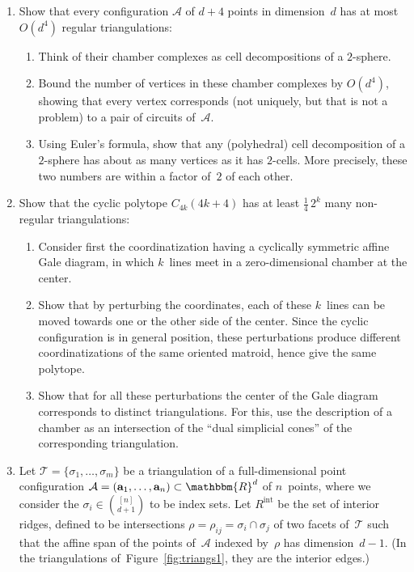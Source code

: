 \documentclass[11pt]{amsart}
\newcommand{\cA}{\mathcal{A}}
\newcommand{\cT}{\mathcal{T}}
\newcommand{\RR}{\mathbbm{R}}
\newcommand{\aaa}{\mathbf{a}}
\newcommand{\defn}[1]{{\color{blue}#1}}
\begin{document}
\begin{enumerate}
  \bigskip

\item
  Show that every configuration $\cA$ of $d+4$ points in dimension~$d$
  has at most $O(d^4)$ regular triangulations:
  \begin{enumerate}
  \item
    Think of their chamber complexes as cell decompositions of a $2$-sphere.

  \item
    Bound the number of vertices in these chamber complexes by $O(d^4)$,
    showing that every vertex corresponds
    (not uniquely, but that is not a problem)
    to a pair of circuits of~$\cA$.

  \item
    Using Euler's formula, show that any (polyhedral) cell
    decomposition of a $2$-sphere has about as many vertices as it has
    $2$-cells. More precisely, these two numbers are within a factor of~$2$
     of each other.
   \end{enumerate}

   \bigskip

 \item
   Show that the cyclic polytope $C_{4k}(4k+4)$ has at least $\frac14\,2^k$ many
   non-regular triangulations:
   \begin{enumerate}
   \item
     Consider first the coordinatization having a cyclically symmetric affine
     Gale diagram, in which $k$~lines meet in a zero-dimensional chamber
     at the center.

   \item
     Show that by perturbing the coordinates, each of these $k$~lines can be
     moved towards one or the other side of the center.
     Since the cyclic configuration is in general position,
     these perturbations produce different coordinatizations of the same oriented matroid,
     hence give the same polytope.

   \item
     Show that for all these perturbations the center of the Gale diagram
     corresponds to distinct triangulations. For this, use the description
     of a chamber as an intersection of the ``dual simplicial cones'' of the
     corresponding triangulation.
   \end{enumerate}
  \bigskip
  
\item
  Let $\cT=\{\sigma_1,\dots,\sigma_m\}$ be a triangulation of a full-dimensional point configuration $\cA=(\aaa_1,\dots,\aaa_n)\subset\RR^d$ of $n$~points,
  where we consider the $\sigma_i\in\binom{[n]}{d+1}$ to be index sets.
  Let $R^{\text{int}}$ be the set of \defn{interior ridges},
  defined to be intersections $\rho = \rho_{ij} = \sigma_i\cap\sigma_j$ of two facets of~$\cT$
  such that the affine span of the points of~$\cA$ indexed by~$\rho$ has dimension~$d-1$.
  (In the triangulations of~Figure~\ref{fig:triangs1}, they are the interior edges.)


\end{enumerate}
\end{document}
